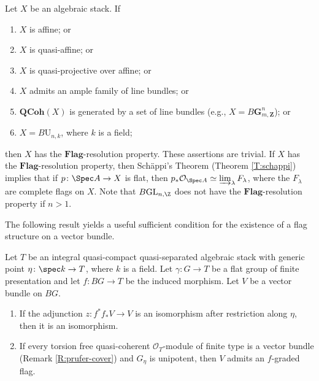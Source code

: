 \documentclass[reqno,a4paper]{amsart}
\numberwithin{Theorem}{section}
\newcommand{\Orb}{\mathcal{O}}
\newcommand{\QCoh}{\mathbf{QCoh}}
\renewcommand{\GL}{\mathrm{GL}}
\renewcommand{\U}{\mathrm{U}}
\newcommand{\Flag}{\mathbf{Flag}}
\theoremstyle{plain}
\theoremstyle{remark}
\newcommand{\classB}{B}
\begin{document}
\begin{Example}\label{E:flag-resolution}
  Let $X$ be an algebraic stack. If
  \begin{enumerate}
  \item $X$ is affine; or 
  \item $X$ is quasi-affine; or
  \item $X$ is quasi-projective over affine; or
  \item $X$ admits an ample family of line bundles; or 
  \item $\QCoh(X)$ is generated by a set of line bundles (e.g.,
    $X=\classB \mathbf{G}_{m, \mathbf{Z}}^n$); or
  \item $X=\classB \U_{n,k}$, where $k$ is a field;
  \end{enumerate} 
  then $X$ has the $\Flag$-resolution property. These assertions are
  trivial. If $X$ has the $\Flag$-resolution property, then
  Sch\"appi's Theorem (Theorem \ref{T:schappi}) implies that if
  $p \colon \Spec A \to X$ is flat, then
  $p_*\Orb_{\Spec A} \simeq \varinjlim_{\lambda} F_\lambda$, where the
  $F_\lambda$ are complete flags on $X$. Note that
  $\classB \GL_{n,\Z}$ does not have the $\Flag$-resolution property
  if $n>1$.
\end{Example}
The following result yields a useful sufficient condition
for the existence of a flag structure on a vector bundle. 
\begin{lemma} \label{L:pruferflag} Let $T$ be an integral
  quasi-compact quasi-separated algebraic stack with generic point
  $\eta \colon \spec k \to T$, where $k$ is a field. Let $\gamma \colon G \to T$ be
  a flat group of finite presentation and let
  $f \colon \classB G \to T$ be the induced morphism. Let $V$ be a
  vector bundle on $\classB G$.
  \begin{enumerate}
  \item \label{LI:pruferflag:adjunction} If the adjunction
    $z \colon f^*f_*V \to V$ is an isomorphism after restriction
    along $\eta$, then it is an isomorphism.
  \item \label{LI:pruferflag:flag} If every torsion free
    quasi-coherent $\Orb_T$-module of finite type is a vector bundle
    (Remark \ref{R:prufer-cover}) and $G_\eta$ is
    unipotent, then $V$ admits an $f$-graded flag.
  \end{enumerate}
\end{lemma}
\end{document}
